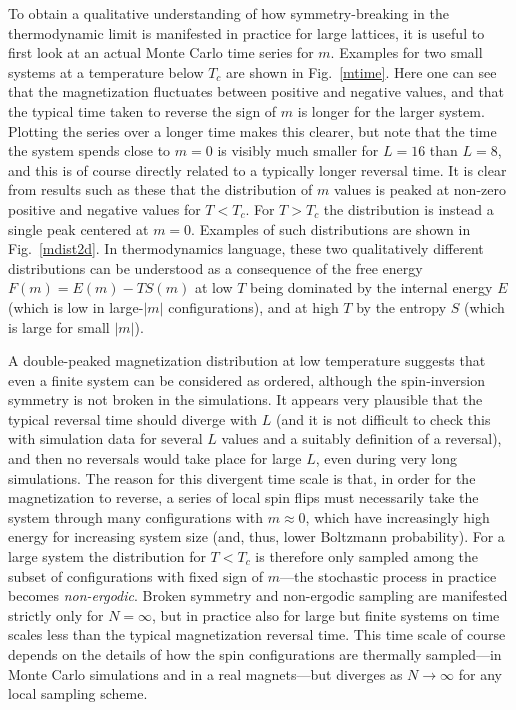 \documentclass[draft,numberedheadings]{aipproc}
\begin{document}
To obtain a qualitative understanding of how symmetry-breaking in the thermodynamic limit is manifested in practice for large lattices, it is
useful to first look at an actual Monte Carlo time series for $m$. Examples for two small systems at a temperature below $T_c$ are shown 
in Fig.~\ref{mtime}. Here one can see that the magnetization fluctuates between positive and negative values, and that the typical time taken to 
reverse the sign of $m$ is longer for the larger system. Plotting the series over a longer time makes this clearer, but note that the time the 
system spends close to $m=0$ is visibly much smaller for $L=16$ than $L=8$, and this is of course directly related to a typically longer reversal 
time. It is clear from results such as these that the distribution of $m$ values is peaked at non-zero positive and negative values for $T<T_c$.
For $T>T_c$ the distribution is instead a single peak centered at $m=0$. Examples of such distributions are shown in Fig.~\ref{mdist2d}.
In thermodynamics language, these two qualitatively different distributions can be understood as a consequence of the free energy $F(m)=E(m)-TS(m)$ 
at low $T$ being dominated by the internal energy $E$ (which is low in large-$|m|$ configurations), and at high $T$ by the entropy $S$ 
(which is large for small $|m|$).

A double-peaked magnetization distribution at low temperature suggests that even a finite system can be considered as ordered, although the 
spin-inversion symmetry is not broken in the simulations. It appears very plausible that the typical reversal time should diverge with 
$L$ (and it is not difficult to check this with simulation data for several $L$ values and a suitably definition of a reversal), and then no 
reversals would take place for large $L$, even during very long simulations. The reason for this divergent time scale is that, 
in order for the magnetization to reverse, a series of local spin flips must necessarily take the system through many configurations 
with $m\approx 0$, which have increasingly high energy for increasing system size (and, thus, lower Boltzmann probability). For a large system 
the distribution for $T<T_c$ is therefore only sampled among the subset of configurations with fixed sign of $m$---the stochastic process in 
practice becomes {\it non-ergodic}. Broken symmetry and non-ergodic sampling are manifested strictly only for $N=\infty$, but in practice also for large 
but finite systems on time scales less than the typical magnetization reversal time. This time scale of course depends on the details of how the spin 
configurations are thermally sampled---in Monte Carlo simulations and in a real magnets---but diverges as $N\to \infty$ for any local sampling scheme. 
\end{document}
